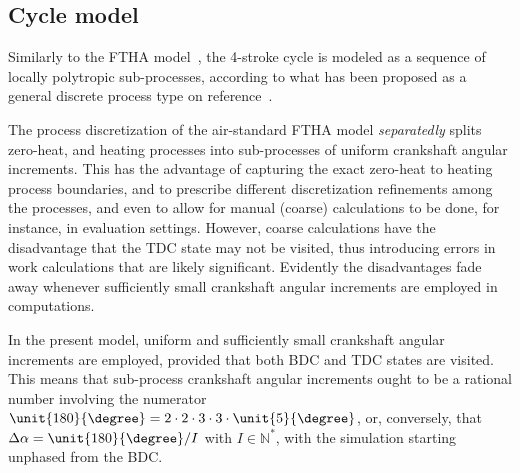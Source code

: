     \subsection{Cycle model}\label{sec:model.cyclem}

    Similarly to the FTHA model~\cite{2017-NaaktgeborenC-IntJMechEngEduc}, the 4-stroke cycle is modeled as a sequence of locally polytropic sub-processes, according to what has been  proposed
    as a general discrete process type on reference~\cite{2020-NaaktgeborenC-Polytropic-engrXiv-rev02}.

    The process discretization of the air-standard FTHA model \emph{separatedly} splits zero-heat, and heating processes into sub-processes of uniform crankshaft angular increments.  This  has
    the advantage of capturing the exact zero-heat to heating process boundaries, and to prescribe different discretization refinements among the  processes,  and  even  to  allow  for  manual
    (coarse) calculations to be done, for instance, in evaluation settings. However, coarse calculations have the disadvantage that the TDC state may not be visited, thus introducing errors in
    work calculations that are likely significant. Evidently the disadvantages fade away whenever sufficiently small crankshaft angular increments are employed in computations.

    In the present model, uniform and sufficiently small crankshaft angular increments are employed, provided that both BDC and TDC states are visited. This means that  sub-process  crankshaft
    angular increments ought to be a rational number involving the numerator $\unit{180}{\degree} = 2 \cdot 2 \cdot 3 \cdot 3 \cdot \unit{5}{\degree}$, or,  conversely,  that  $\Delta\alpha  =
    \unit{180}{\degree} / I$ with $I \in \mathbb{N}^*$, with the simulation starting unphased from the BDC.

